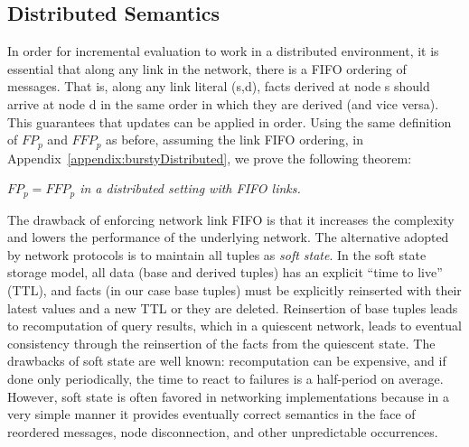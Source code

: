 
\subsection{Distributed Semantics}

In order for incremental evaluation to work in a distributed
  environment, it is essential that along any link in the network, there
  is a FIFO ordering of messages. That is, along any link literal \link(s,d), facts
  derived at node s should arrive at node d in the same order in which they
  are derived (and vice versa). This guarantees that updates can be
  applied in order. Using the same definition of $FP_{p}$ and $FFP_{p}$ as before, assuming the link FIFO ordering, in Appendix~\ref{appendix:burstyDistributed}, we prove the following
theorem:

 {\em $FP_{p} = FFP_{p}$
in a distributed setting with FIFO links. }

The drawback of enforcing network link FIFO is that it increases the
  complexity and lowers the performance of the underlying network. The
  alternative adopted by network protocols is to maintain all tuples as
  {\em soft state}. In the soft state storage model, all data (base
  and derived tuples) has an explicit ``time to live'' (TTL), and
  facts (in our case base tuples) must be explicitly reinserted with
  their latest values and a new TTL or they are deleted. Reinsertion
  of base tuples
  leads to recomputation of query results, which in a quiescent
  network, leads to eventual consistency through the reinsertion of
  the facts from the quiescent state. 
  The drawbacks of soft state are well known:  recomputation can be expensive, and
  if done only periodically, the time to react to failures is a half-period on
  average.  However, soft state is often favored in networking
  implementations because in a very simple manner it provides eventually correct semantics in
  the face of reordered messages, node disconnection, and
  other unpredictable occurrences.\\


